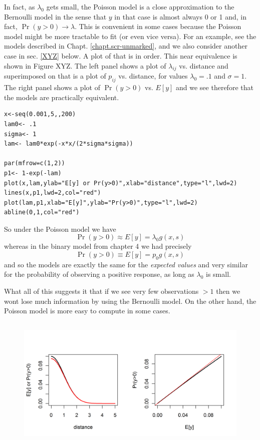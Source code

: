 In fact, as $\lambda_0$ gets small, the Poisson model is a close approximation
to the Bernoulli model in the sense that $y$ in that case is almost
always 0 or 1 and, in fact, $\Pr(y>0) \rightarrow \lambda$.  This is
convenient in some cases because the Poisson model might be more
tractable to fit (or even vice versa). For an example, see the models
described in Chapt. \ref{chapt.scr-unmarked}, and we also consider
another case in sec. \ref{XYZ} below.
A plot of that is in order. This near equivalence is shown in  Figure
XYZ. The left panel shows a plot of $\lambda_{ij}$ vs. distance and
superimposed on that is a plot of $p_{ij}$ vs. distance, for values
$\lambda_{0} = .1$ and $\sigma = 1$. The right panel shows a plot of
$\Pr(y>0)$ vs. $E[y]$ and we see therefore that the models are
practically equivalent. 

\begin{verbatim}
x<-seq(0.001,5,,200)
lam0<- .1
sigma<- 1
lam<- lam0*exp(-x*x/(2*sigma*sigma))

par(mfrow=c(1,2))
p1<- 1-exp(-lam)
plot(x,lam,ylab="E[y] or Pr(y>0)",xlab="distance",type="l",lwd=2)
lines(x,p1,lwd=2,col="red")
plot(lam,p1,xlab="E[y]",ylab="Pr(y>0)",type="l",lwd=2)
abline(0,1,col="red")
\end{verbatim}

So under the Poisson model we have
\[
\Pr(y>0) \approx E[y] = \lambda_{0} g(x,s)
\]
whereas in the binary model from chapter 4 we had precisely
\[
\Pr(y>0) \equiv E[y] = p_{0} g(x,s)
\]
and so the models are exactly the same for the {\it expected values}
and very similar for the probability of observing a positive response,
as long as $\lambda_{0}$ is small.


What all of this suggests it that
if we see very few observations $>1$ then we wont lose much
information by using the Bernoulli model. On the other hand, the
Poisson model is more easy to compute in some cases. 


\begin{figure}
\centering
\includegraphics[width=5in,height=2.5in]{Ch5/figs/Poisson-Bern.png}
\label{fig:elevMap}
\end{figure}




